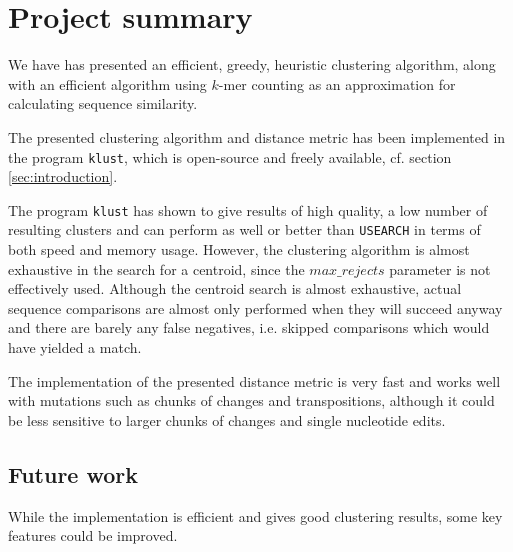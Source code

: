 \section{Project summary}
\label{sec:conclusions}

We have has presented an efficient, greedy, heuristic clustering algorithm,
along with an efficient algorithm using $k$-mer counting as an approximation
for calculating sequence similarity.

The presented clustering algorithm and distance metric has been implemented in
the program \texttt{klust}, which is open-source and freely available, cf.
section \ref{sec:introduction}.

The program \texttt{klust} has shown to give results of high quality, a low
number of resulting clusters and can perform as well or better than
\texttt{USEARCH} in terms of both speed and memory usage. However, the
clustering algorithm is almost exhaustive in the search for a centroid, since
the $max\_rejects$ parameter is not effectively used. Although the centroid
search is almost exhaustive, actual sequence comparisons are almost only
performed when they will succeed anyway and there are barely any false
negatives, i.e. skipped comparisons which would have yielded a match.

The implementation of the presented distance metric is very fast and works
well with mutations such as chunks of changes and transpositions, although it
could be less sensitive to larger chunks of changes and single nucleotide
edits.


\subsection{Future work}
\label{sec:future_work}

While the implementation is efficient and gives good clustering
results, some key features could be improved.

